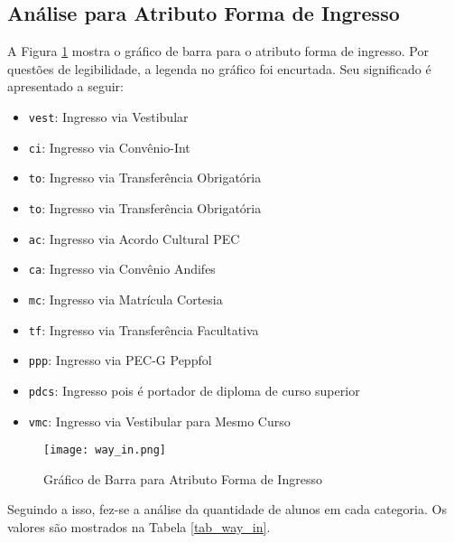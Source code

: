 \subsection{Análise para Atributo Forma de Ingresso}
A Figura \ref{atr_way_in} mostra o gráfico de barra para o atributo forma de ingresso. 
Por questões de legibilidade, a legenda no gráfico foi encurtada. Seu significado é
apresentado a seguir: 
\begin{itemize}
    \item \texttt{vest}: Ingresso via Vestibular
    \item \texttt{ci}: Ingresso via Convênio-Int
    \item \texttt{to}: Ingresso via Transferência Obrigatória
    \item \texttt{to}: Ingresso via Transferência Obrigatória
    \item \texttt{ac}: Ingresso via Acordo Cultural PEC
    \item \texttt{ca}: Ingresso via Convênio Andifes
    \item \texttt{mc}: Ingresso via Matrícula Cortesia
    \item \texttt{tf}: Ingresso via Transferência Facultativa
    \item \texttt{ppp}: Ingresso via PEC-G Peppfol
    \item \texttt{pdcs}: Ingresso pois é portador de diploma de curso superior
    \item \texttt{vmc}: Ingresso via Vestibular para Mesmo Curso
\end{itemize}

\begin{figure}[!ht]
    \caption{Gráfico de Barra para Atributo Forma de Ingresso}
    \centering
    \texttt{[image: way\_in.png]}
    \label{atr_way_in}
\end{figure}

Seguindo a isso, fez-se a análise da quantidade de alunos em cada categoria. Os
valores são mostrados na Tabela \ref{tab_way_in}.

